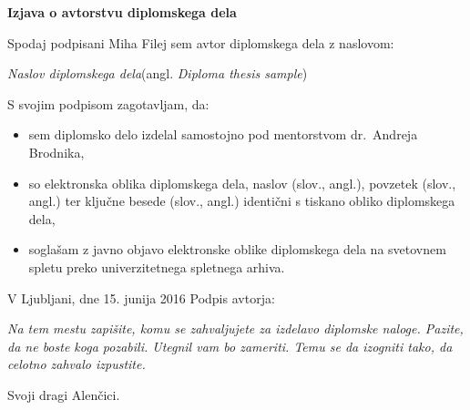 \documentclass[a4paper, 12pt]{book}
\newcommand{\ttitle}{Naslov diplomskega dela}
\newcommand{\ttitleEn}{Diploma thesis sample}
\newcommand{\tauthor}{Miha Filej}
\newcommand{\clearemptydoublepage}{\newpage{\pagestyle{empty}\cleardoublepage}}
\begin{document}
\vspace{2cm}

\clearemptydoublepage

\vspace*{1cm}
\begin{center}
{\Large \textbf{\sc Izjava o avtorstvu diplomskega dela}}
\end{center}

\vspace{1cm}
\noindent Spodaj podpisani \tauthor{} sem avtor diplomskega dela z naslovom:

\vspace{0.5cm}
\emph{\ttitle}\hspace{5mm}(angl. \emph{\ttitleEn})

\vspace{1.5cm}
\noindent S svojim podpisom zagotavljam, da:
\begin{itemize}
  \item sem diplomsko delo izdelal samostojno pod mentorstvom dr.\ Andreja Brodnika,
  \item so elektronska oblika diplomskega dela, naslov (slov., angl.), povzetek (slov., angl.) ter ključne besede (slov., angl.) identični s tiskano obliko diplomskega dela,
  \item soglašam z javno objavo elektronske oblike diplomskega dela na svetovnem spletu preko univerzitetnega spletnega arhiva.	
\end{itemize}

\vspace{1cm}
\noindent V Ljubljani, dne 15. junija 2016 \hfill Podpis avtorja:

\clearemptydoublepage

\thispagestyle{empty}\mbox{}\vfill\null\it%
Na tem mestu zapišite, komu se zahvaljujete za izdelavo diplomske naloge. Pazite, da ne boste koga pozabili. Utegnil vam bo zameriti. Temu se da izogniti tako, da celotno zahvalo izpustite.

\rm\normalfont

\clearemptydoublepage

\thispagestyle{empty}\mbox{}{\textheight}\mbox{}\hfill\begin{minipage}{0.55\textwidth}%
Svoji dragi Alenčici.
\normalfont\end{minipage}
\end{document}
